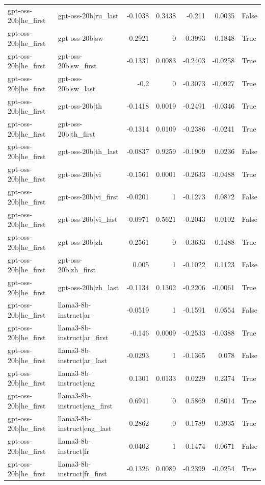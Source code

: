 \begin{table}
\begin{tabular}{l l r r r r l}
gpt-oss-20b|he_first & gpt-oss-20b|ru_last & -0.1038 & 0.3438 & -0.211 & 0.0035 & False \\
gpt-oss-20b|he_first & gpt-oss-20b|sw & -0.2921 & 0 & -0.3993 & -0.1848 & True \\
gpt-oss-20b|he_first & gpt-oss-20b|sw_first & -0.1331 & 0.0083 & -0.2403 & -0.0258 & True \\
gpt-oss-20b|he_first & gpt-oss-20b|sw_last & -0.2 & 0 & -0.3073 & -0.0927 & True \\
gpt-oss-20b|he_first & gpt-oss-20b|th & -0.1418 & 0.0019 & -0.2491 & -0.0346 & True \\
gpt-oss-20b|he_first & gpt-oss-20b|th_first & -0.1314 & 0.0109 & -0.2386 & -0.0241 & True \\
gpt-oss-20b|he_first & gpt-oss-20b|th_last & -0.0837 & 0.9259 & -0.1909 & 0.0236 & False \\
gpt-oss-20b|he_first & gpt-oss-20b|vi & -0.1561 & 0.0001 & -0.2633 & -0.0488 & True \\
gpt-oss-20b|he_first & gpt-oss-20b|vi_first & -0.0201 & 1 & -0.1273 & 0.0872 & False \\
gpt-oss-20b|he_first & gpt-oss-20b|vi_last & -0.0971 & 0.5621 & -0.2043 & 0.0102 & False \\
gpt-oss-20b|he_first & gpt-oss-20b|zh & -0.2561 & 0 & -0.3633 & -0.1488 & True \\
gpt-oss-20b|he_first & gpt-oss-20b|zh_first & 0.005 & 1 & -0.1022 & 0.1123 & False \\
gpt-oss-20b|he_first & gpt-oss-20b|zh_last & -0.1134 & 0.1302 & -0.2206 & -0.0061 & True \\
gpt-oss-20b|he_first & llama3-8b-instruct|ar & -0.0519 & 1 & -0.1591 & 0.0554 & False \\
gpt-oss-20b|he_first & llama3-8b-instruct|ar_first & -0.146 & 0.0009 & -0.2533 & -0.0388 & True \\
gpt-oss-20b|he_first & llama3-8b-instruct|ar_last & -0.0293 & 1 & -0.1365 & 0.078 & False \\
gpt-oss-20b|he_first & llama3-8b-instruct|eng & 0.1301 & 0.0133 & 0.0229 & 0.2374 & True \\
gpt-oss-20b|he_first & llama3-8b-instruct|eng_first & 0.6941 & 0 & 0.5869 & 0.8014 & True \\
gpt-oss-20b|he_first & llama3-8b-instruct|eng_last & 0.2862 & 0 & 0.1789 & 0.3935 & True \\
gpt-oss-20b|he_first & llama3-8b-instruct|fr & -0.0402 & 1 & -0.1474 & 0.0671 & False \\
gpt-oss-20b|he_first & llama3-8b-instruct|fr_first & -0.1326 & 0.0089 & -0.2399 & -0.0254 & True \\

\end{tabular}
\end{table}
